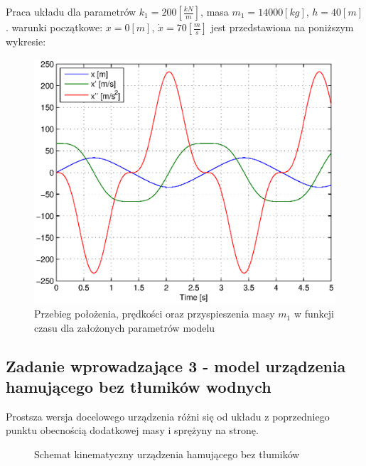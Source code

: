 \documentclass[12pt]{article}
\begin{document}
Praca układu dla parametrów $k_1 = 200[\frac{kN}{m}]$, masa
$m_1 = 14000[kg]$, $h = 40[m]$. warunki początkowe: $x = 0[m]$, $\dot{x} =
70[\frac{m}{s}]$ jest przedstawiona na poniższym wykresie:

\begin{figure}[!htb]
	\begin{center}
		\includegraphics[width=14cm]{../res/img/wpr_spr_nl.eps}
	\end{center} 
	\caption{Przebieg położenia, prędkości oraz
	przyspieszenia masy $m_1$ w funkcji czasu dla założonych parametrów modelu} 
	\label{rys:wpr_spr_nl} 
\end{figure}

\newpage

\subsection{Zadanie wprowadzające 3 - model urządzenia hamującego bez tłumików
wodnych}

Prostsza wersja docelowego urządzenia różni się od układu z poprzedniego punktu
obecnością dodatkowej masy i sprężyny na stronę.

\begin{figure}[!htb]
	\begin{center}
		
		\caption{Schemat kinematyczny urządzenia hamującego bez tłumików}
		\label{rys:wpr_hamsam_sch}
	\end{center}
\end{figure}
\end{document}
